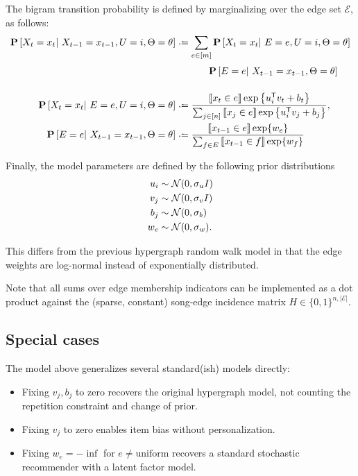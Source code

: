 \documentclass{article}
\begin{document}
The bigram transition probability is defined by marginalizing over the edge set $\mathcal{E}$, as follows:
\begin{align*}
\P\left[X_{t}= x_t \given X_{t-1}=x_{t-1}, U=i, \Theta=\theta \right] &\defeq \sum_{e \in [m]} 
\P\left[X_{t}=x_t \given E=e, U=i, \Theta=\theta\right]\\
&\phantom{\defeq \sum_{e\in[m]}} \P\left[E=e \given X_{t-1} = x_{t-1}, \Theta=\theta\right]\\
\P\left[X_t=x_t \given E=e, U=i, \Theta=\theta \right] &\defeq 
\frac{\ind{x_t \in e}\exp\left\{u_i\trans v_t + b_t\right\}}{\sum_{j \in [n]}\ind{x_j \in e} \exp\left\{u_i\trans v_j + b_j\right\}},
\\
\P\left[E=e \given X_{t-1}=x_{t-1}, \Theta=\theta\right] &\defeq \frac{\ind{x_{t-1}\in e}\exp\{w_e\}}{ \sum_{f \in E} \ind{x_{t-1} \in f} \exp\{w_f\} }
\end{align*}

Finally, the model parameters are defined by the following prior distributions
\begin{align*}
u_i &\sim \mathcal{N}(0, \sigma_u I)\\
v_j &\sim \mathcal{N}(0, \sigma_v I)\\
b_j &\sim \mathcal{N}(0, \sigma_b)\\
w_e &\sim \mathcal{N}(0, \sigma_w).\\
\end{align*}

This differs from the previous hypergraph random walk model in that the edge weights are log-normal instead of
exponentially distributed.  

Note that all sums over edge membership indicators can be implemented as a dot product against the (sparse, constant) 
song-edge incidence matrix $H \in \{0,1\}^{n, |\mathcal{E}|}$.

\subsection{Special cases}
The model above generalizes several standard(ish) models directly:
\begin{itemize}
\item Fixing $v_j, b_j$ to zero recovers the original hypergraph model, not counting the repetition constraint and
change of prior.
\item Fixing $v_j$ to zero enables item bias without personalization.
\item Fixing $w_e = -\inf$ for $e \neq \text{uniform}$ recovers a standard stochastic recommender with a latent factor
model.
\end{itemize}
\end{document}
